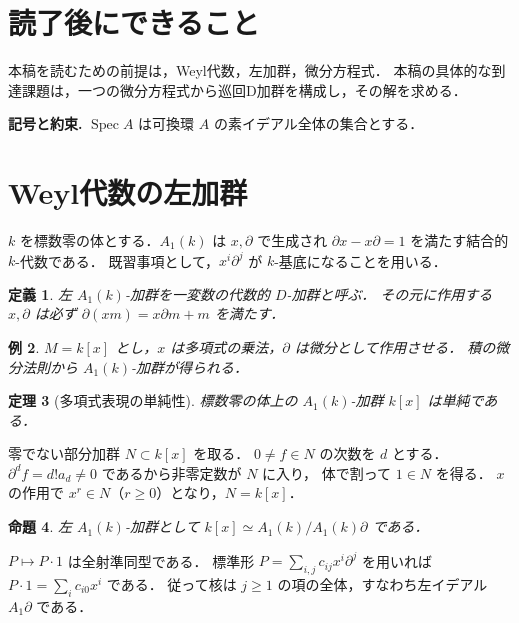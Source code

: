 \documentclass[a5paper,10pt,onecolumn]{jsarticle}
\makeatletter
\theoremstyle{mathnotetheorem}
\newtheorem{theorem}{定理}[section]
\newtheorem{definition}[theorem]{定義}
\newtheorem{proposition}[theorem]{命題}
\newtheorem{example}[theorem]{例}
\renewcommand{\proofname}{証明}
\renewenvironment{proof}[1][\proofname]{%
  \par\pushQED{\qed}\normalfont\topsep4\p@\@plus2\p@\relax
  \trivlist\item[\hskip\labelsep\bfseries #1]\ignorespaces
}{\popQED\endtrivlist\@endpefalse}
\makeatother
\begin{document}
\section*{読了後にできること}
本稿を読むための前提は，Weyl代数，左加群，微分方程式．
本稿の具体的な到達課題は，一つの微分方程式から巡回D加群を構成し，その解を求める．


\par\noindent\textbf{記号と約束.}\quad
$\operatorname{Spec}A$ は可換環 $A$ の素イデアル全体の集合とする．
\par

\section{Weyl代数の左加群}
$k$ を標数零の体とする．$A_1(k)$ は $x,\partial$ で生成され
$\partial x-x\partial=1$ を満たす結合的 $k$-代数である．
既習事項として，$x^i\partial^j$ が $k$-基底になることを用いる．
\begin{definition}
左 $A_1(k)$-加群を一変数の代数的 $D$-加群と呼ぶ．
その元に作用する $x,\partial$ は必ず
$\partial(xm)=x\partial m+m$ を満たす．
\end{definition}
\begin{example}
$M=k[x]$ とし，$x$ は多項式の乗法，$\partial$ は微分として作用させる．
積の微分法則から $A_1(k)$-加群が得られる．
\end{example}
\begin{theorem}[多項式表現の単純性]
標数零の体上の $A_1(k)$-加群 $k[x]$ は単純である．
\end{theorem}
\begin{proof}
零でない部分加群 $N\subset k[x]$ を取る．
$0\ne f\in N$ の次数を $d$ とする．
$\partial^d f=d!a_d\ne0$ であるから非零定数が $N$ に入り，
体で割って $1\in N$ を得る．
$x$ の作用で $x^r\in N$（$r\ge0$）となり，$N=k[x]$．
\end{proof}
\begin{proposition}
左 $A_1(k)$-加群として $k[x]\simeq A_1(k)/A_1(k)\partial$ である．
\end{proposition}
\begin{proof}
$P\mapsto P\cdot1$ は全射準同型である．
標準形 $P=\sum_{i,j}c_{ij}x^i\partial^j$ を用いれば
$P\cdot1=\sum_i c_{i0}x^i$ である．
従って核は $j\ge1$ の項の全体，すなわち左イデアル $A_1\partial$ である．
\end{proof}
\end{document}
